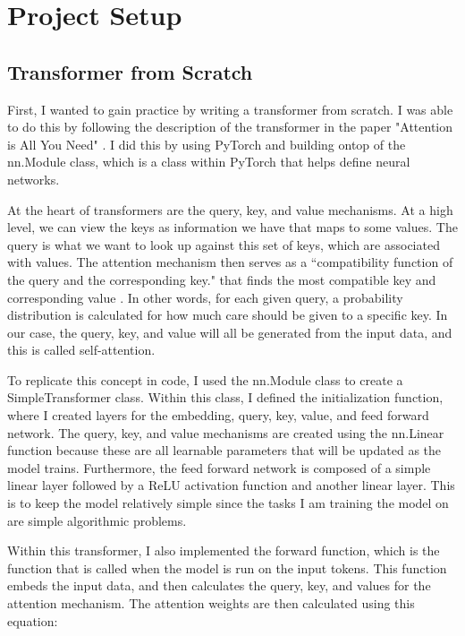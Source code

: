 \documentclass{article}
\begin{document}
\section{Project Setup}

\subsection{Transformer from Scratch}

First, I wanted to gain practice by writing a transformer from scratch. I was able to do this by following the description of the transformer in the paper "Attention is All You Need" \cite{7}. I did this by using PyTorch and building ontop of the nn.Module class, which is a class within PyTorch that helps define neural networks. 

At the heart of transformers are the query, key, and value mechanisms. At a high level, we can view the keys as information we have that maps to some values. The query is what we want to look up against this set of keys, which are associated with values. The attention mechanism then serves as a ``compatibility function of the query and the corresponding key." that finds the most compatible key and corresponding value \cite{7}. In other words, for each given query, a probability distribution is calculated for how much care should be given to a specific key. In our case, the query, key, and value will all be generated from the input data, and this is called self-attention. 

To replicate this concept in code, I used the nn.Module class to create a SimpleTransformer class. Within this class, I defined the initialization function,
where I created layers for the embedding, query, key, value, and feed forward network. The query, key, and value mechanisms are created using the nn.Linear function because these are all learnable parameters that will be updated as the model trains. Furthermore, the feed forward network is composed of a simple linear layer followed by a ReLU activation function and another linear layer. This is to keep the model relatively simple since the tasks I am training the model on are simple algorithmic problems.

Within this transformer, I also implemented the forward function, which is the function that is called when the model is run on the input tokens. This function embeds the input data, and then calculates the query, key, and values for the attention mechanism. The attention weights are then calculated using this equation:
\end{document}
